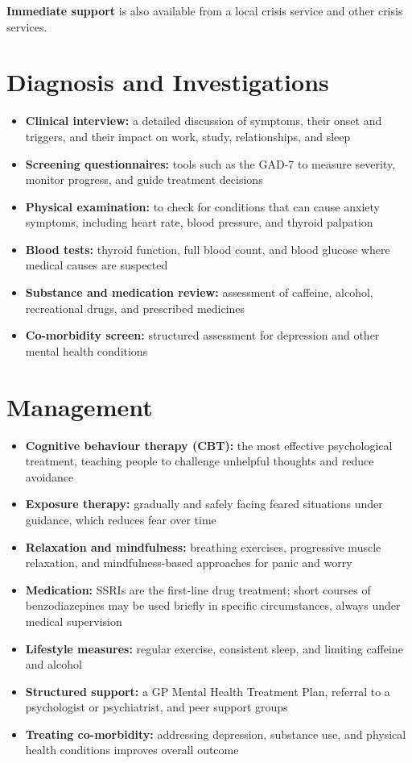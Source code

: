 \textbf{Immediate support} is also available from a local crisis service and other crisis services.

\section*{Diagnosis and Investigations}
\begin{itemize}
    \item \textbf{Clinical interview:} a detailed discussion of symptoms, their onset and triggers, and their impact on work, study, relationships, and sleep
    \item \textbf{Screening questionnaires:} tools such as the GAD-7 to measure severity, monitor progress, and guide treatment decisions
    \item \textbf{Physical examination:} to check for conditions that can cause anxiety symptoms, including heart rate, blood pressure, and thyroid palpation
    \item \textbf{Blood tests:} thyroid function, full blood count, and blood glucose where medical causes are suspected
    \item \textbf{Substance and medication review:} assessment of caffeine, alcohol, recreational drugs, and prescribed medicines
    \item \textbf{Co-morbidity screen:} structured assessment for depression and other mental health conditions
\end{itemize}

\section*{Management}
\begin{itemize}
    \item \textbf{Cognitive behaviour therapy (CBT):} the most effective psychological treatment, teaching people to challenge unhelpful thoughts and reduce avoidance
    \item \textbf{Exposure therapy:} gradually and safely facing feared situations under guidance, which reduces fear over time
    \item \textbf{Relaxation and mindfulness:} breathing exercises, progressive muscle relaxation, and mindfulness-based approaches for panic and worry
    \item \textbf{Medication:} SSRIs are the first-line drug treatment; short courses of benzodiazepines may be used briefly in specific circumstances, always under medical supervision
    \item \textbf{Lifestyle measures:} regular exercise, consistent sleep, and limiting caffeine and alcohol
    \item \textbf{Structured support:} a GP Mental Health Treatment Plan, referral to a psychologist or psychiatrist, and peer support groups
    \item \textbf{Treating co-morbidity:} addressing depression, substance use, and physical health conditions improves overall outcome
\end{itemize}

